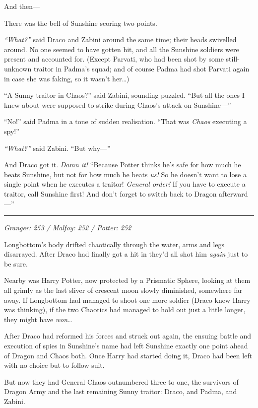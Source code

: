 And then---

There was the bell of Sunshine scoring two points.

\emph{``What?''} said Draco and Zabini around the same time; their heads
swivelled around. No one seemed to have gotten hit, and all the Sunshine
soldiers were present and accounted for. (Except Parvati, who had been
shot by some still-unknown traitor in Padma's squad; and of course Padma
had shot Parvati again in case she was faking, so it wasn't her\ldots{})

``A Sunny traitor in Chaos?'' said Zabini, sounding puzzled. ``But all
the ones I knew about were supposed to strike during Chaos's attack on
Sunshine---''

``No!'' said Padma in a tone of sudden realisation. ``That was
\emph{Chaos} executing a spy!''

\emph{``What?''} said Zabini. ``But why---''

And Draco got it. \emph{Damn it!} ``Because Potter thinks he's safe for
how much he beats Sunshine, but not for how much he beats \emph{us!} So
he doesn't want to lose a single point when he executes a traitor!
\emph{General order!} If you have to execute a traitor, call Sunshine
first! And don't forget to switch back to Dragon afterward---''

\begin{center}\rule{3in}{0.4pt}\end{center}

\emph{Granger: 253 / Malfoy: 252 / Potter: 252}

Longbottom's body drifted chaotically through the water, arms and legs
disarrayed. After Draco had finally got a hit in they'd all shot him
\emph{again} just to be sure.

Nearby was Harry Potter, now protected by a Prismatic Sphere, looking at
them all grimly as the last sliver of crescent moon slowly diminished,
somewhere far away. If Longbottom had managed to shoot one more soldier
(Draco knew Harry was thinking), if the two Chaotics had managed to hold
out just a little longer, they might have \emph{won}\ldots{}

After Draco had reformed his forces and struck out again, the ensuing
battle and execution of spies in Sunshine's name had left Sunshine
exactly one point ahead of Dragon and Chaos both. Once Harry had started
doing it, Draco had been left with no choice but to follow suit.

But now they had General Chaos outnumbered three to one, the survivors
of Dragon Army and the last remaining Sunny traitor: Draco, and Padma,
and Zabini.

